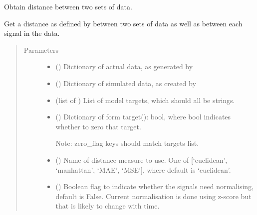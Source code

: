\documentclass[letterpaper,10pt,english]{sphinxmanual}
\begin{document}
\begin{fulllineitems}
\label{\detokenize{abc:bayescmd.abc.distances.get_distance}}
Obtain  distance between two sets of data.

Get a distance as defined by  between two sets of data as well
as between each signal in the data.
\begin{quote}\begin{description}
\item[{Parameters}] \leavevmode\begin{itemize}
\item {} 
 () \textendash{} Dictionary of actual data, as generated by

\item {} 
 () \textendash{} Dictionary of simulated data, as created by
{\hyperref[\detokenize{bcmdModel:bayescmd.bcmdModel.ModelBCMD.output_parse}]{}}

\item {} 
 (list of ) \textendash{} List of model targets, which should all be strings.

\item {} 
 () \textendash{} 
Dictionary of form target(): bool, where bool indicates
whether to zero that target.

Note: zero\_flag keys should match targets list.


\item {} 
 (\sphinxstyleliteralemphasis{, }) \textendash{} Name of distance measure to use. One of {[}‘euclidean’, ‘manhattan’,
‘MAE’, ‘MSE’{]}, where default is ‘euclidean’.

\item {} 
 (\sphinxstyleliteralemphasis{, }) \textendash{} Boolean flag to indicate whether the signals need normalising, default
is False. Current normalisation is done using z-score but that is
likely to change with time.


\end{itemize}
\end{description}
\end{quote}
\end{fulllineitems}
\end{document}
